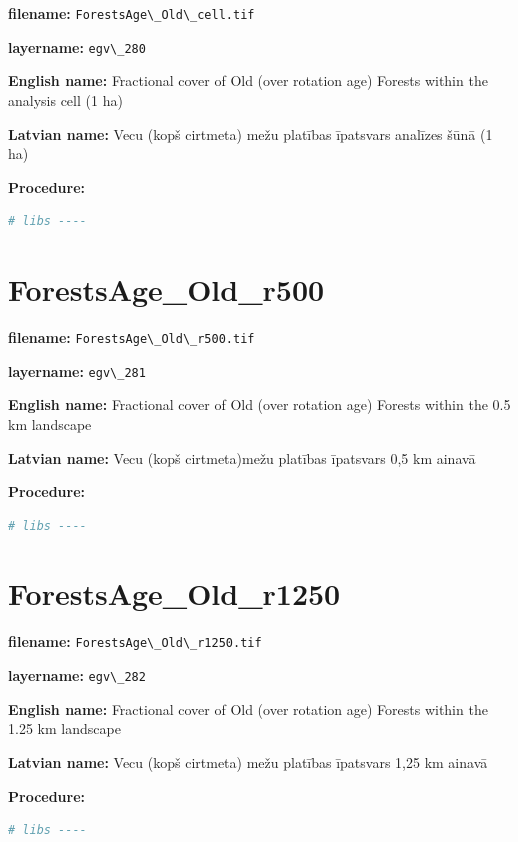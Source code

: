 \documentclass[
]{book}
\newcommand{\passthrough}[1]{#1}
\begin{document}
\textbf{filename:} \passthrough{\lstinline!ForestsAge\_Old\_cell.tif!}

\textbf{layername:} \passthrough{\lstinline!egv\_280!}

\textbf{English name:} Fractional cover of Old (over rotation age) Forests within the analysis cell (1 ha)

\textbf{Latvian name:} Vecu (kopš cirtmeta) mežu platības īpatsvars analīzes šūnā (1 ha)

\textbf{Procedure:}

\begin{lstlisting}[language=R]
# libs ----
\end{lstlisting}

\section{ForestsAge\_Old\_r500}\label{ch06.281}

\textbf{filename:} \passthrough{\lstinline!ForestsAge\_Old\_r500.tif!}

\textbf{layername:} \passthrough{\lstinline!egv\_281!}

\textbf{English name:} Fractional cover of Old (over rotation age) Forests within the 0.5 km landscape

\textbf{Latvian name:} Vecu (kopš cirtmeta)mežu platības īpatsvars 0,5 km ainavā

\textbf{Procedure:}

\begin{lstlisting}[language=R]
# libs ----
\end{lstlisting}

\section{ForestsAge\_Old\_r1250}\label{ch06.282}

\textbf{filename:} \passthrough{\lstinline!ForestsAge\_Old\_r1250.tif!}

\textbf{layername:} \passthrough{\lstinline!egv\_282!}

\textbf{English name:} Fractional cover of Old (over rotation age) Forests within the 1.25 km landscape

\textbf{Latvian name:} Vecu (kopš cirtmeta) mežu platības īpatsvars 1,25 km ainavā

\textbf{Procedure:}

\begin{lstlisting}[language=R]
# libs ----
\end{lstlisting}
\end{document}
